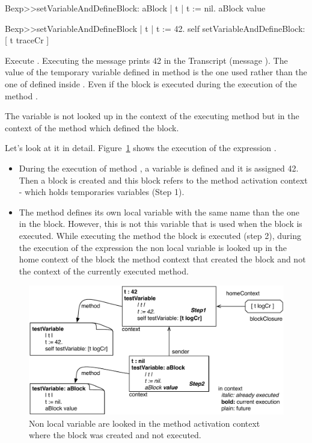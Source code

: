 \documentclass[a4paper,10pt,twoside]{book}
\begin{document}
\begin{code}{}
Bexp>>setVariableAndDefineBlock: aBlock
	| t |
	t := nil.
	aBlock value

Bexp>>setVariableAndDefineBlock
	| t |
	t := 42.
	self setVariableAndDefineBlock: [ t traceCr ]
\end{code}

Execute . Executing the  message  prints 42 in the Transcript (message ). The value of the temporary variable  defined in method  is the one used rather than the one of  defined inside . Even if the block is executed during the execution of the method .

The variable  is not looked up in the context of the executing method  but in the context of the method  which defined the block.

Let's look at it in detail. Figure~\ref{fig:variable} shows the execution of the expression . 

\begin{itemize}
\item During the execution of method , a variable  is defined and it is assigned 42. Then a block is created and this block refers to the method activation context - which holds temporaries variables (Step 1). 

\item The method  defines its own local variable  with the same name than the one in the block. However, this is not this variable that is used when the block is executed. While executing the method  the block is executed (step 2), during the execution of the expression  the non local variable  is looked up in the home context of the block \ie the method context that created the block and not the context of the currently executed method.
\end{itemize}

\begin{figure}[!h]
\begin{center}\includegraphics[width=\textwidth]{variable}
\caption{ Non local variable are looked in the method activation context where the block was created and not executed.\label{fig:variable}}
\end{center}
\end{figure}
\end{document}
